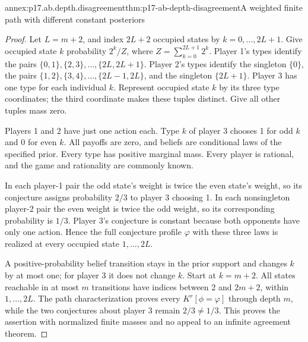 \begin{annexitem}{annex:p17.ab.depth.disagreement}{thm:p17-ab-depth-disagreement}{A weighted finite path with different constant posteriors}
\begin{proof}
Let \(L=m+2\), and index \(2L+2\) occupied states by
\(k=0,\ldots,2L+1\). Give occupied state \(k\) probability
\(2^k/Z\), where \(Z=\sum_{k=0}^{2L+1}2^k\).
Player 1's types identify the pairs
\(\{0,1\},\{2,3\},\ldots,\{2L,2L+1\}\).
Player 2's types identify the singleton \(\{0\}\), the
pairs \(\{1,2\},\{3,4\},\ldots,\{2L-1,2L\}\), and the
singleton \(\{2L+1\}\). Player 3 has one type for each
individual \(k\). Represent occupied state \(k\) by its
three type coordinates; the third coordinate makes these
tuples distinct. Give all other tuples mass zero.

Players 1 and 2 have just one action each. Type \(k\) of
player 3 chooses 1 for odd \(k\) and 0 for even \(k\).
All payoffs are zero, and beliefs are conditional laws of
the specified prior. Every type has positive marginal
mass. Every player is rational, and the game and rationality
are commonly known.

In each player-1 pair the odd state's weight is twice the
even state's weight, so its conjecture assigns probability
\(2/3\) to player 3 choosing 1. In each nonsingleton
player-2 pair the even weight is twice the odd weight,
so its corresponding probability is \(1/3\).
Player 3's conjecture is constant because both opponents
have only one action. Hence the full conjecture profile
\(\varphi\) with these three laws is realized at every
occupied state \(1,\ldots,2L\).

A positive-probability belief transition stays in the
prior support and changes \(k\) by at most one; for player
3 it does not change \(k\). Start at \(k=m+2\).
All states reachable in at most \(m\) transitions have
indices between 2 and \(2m+2\), within \(1,\ldots,2L\).
The path characterization proves every \(K^r[\phi=\varphi]\)
through depth \(m\), while the two conjectures about player
3 remain \(2/3\ne1/3\). This proves the assertion with
normalized finite masses and no appeal to an infinite
agreement theorem.
\end{proof}
\end{annexitem}

